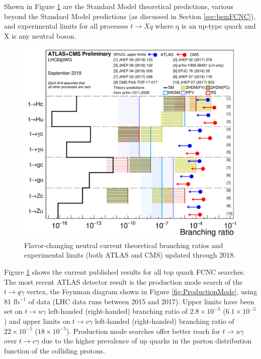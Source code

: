 Shown in Figure \ref{fig:FCNClimits} are the Standard Model theoretical predictions, various beyond the Standard Model predictions (as discussed in Section \ref{sec:bsmFCNC}), and experimental limits for all processes $t\rightarrow Xq$ where q is an up-type quark and X is any neutral boson.  
\begin{figure}[h!]
	\centering
	\includegraphics[width=.8\columnwidth]{../ThesisImages/Theory/AllFCNCLimits.png}
	\caption[Flavor-changing neutral current theoretical branching ratios and experimental limits (both ATLAS and CMS) updated through 2018. ]{Flavor-changing neutral current theoretical branching ratios and experimental limits (both ATLAS and CMS) updated through 2018\cite{TopWG}. }
	\label{fig:FCNClimits}
\end{figure}


Figure \ref{fig:FCNClimits} shows the current published results for all top quark FCNC searches.  The most recent ATLAS detector result is the production mode search of the $t\rightarrow q\gamma$ vertex, the Feynman diagram shown in Figure \ref{fig:ProductionMode}, using 81 $\text{fb}^{-1}$ of data (LHC data runs between 2015 and 2017).  Upper limits have been set on $t\rightarrow u \gamma$ left-handed (right-handed) branching ratio of $2.8\times 10^{-5}$ ($6.1\times 10^{-5}$) and upper limits on $t \rightarrow c \gamma$ left-handed (right-handed) branching ratio of $22\times10^{-5}$ ($18\times10^{-5}$)\cite{GregorFCNC}.  Production mode searches offer better reach for $t\rightarrow u \gamma$ over $t\rightarrow c \gamma$ due to the higher prevalence of up quarks in the parton distribution function of the colliding protons.

